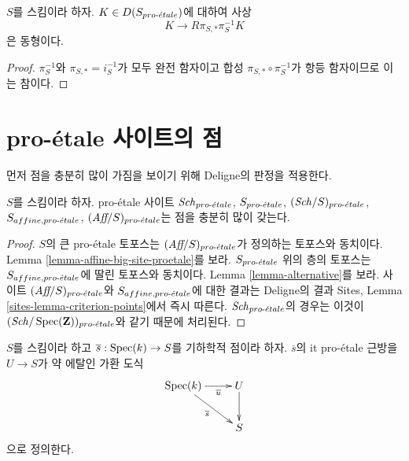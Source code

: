 \begin{lemma}
\label{lemma-cohomological-descent-proetale}
$S$를 스킴이라 하자. $K \in D(S_{pro\text{-}\acute{e}tale})$에 대하여 사상
$$
K \longrightarrow R\pi_{S, *}\pi_S^{-1}K
$$
은 동형이다.
\end{lemma}

\begin{proof}
$\pi_S^{-1}$와 $\pi_{S, *} = i_S^{-1}$가 모두 완전 함자이고 합성
$\pi_{S, *} \circ \pi_S^{-1}$가 항등 함자이므로 이는 참이다.
\end{proof}






















\section{pro-\'etale 사이트의 점}
\label{section-points}

\noindent
먼저 점을 충분히 많이 가짐을 보이기 위해 Deligne의 판정을 적용한다.

\begin{lemma}
\label{lemma-points-proetale}
$S$를 스킴이라 하자. pro-\'etale 사이트
$\mathit{Sch}_{pro\text{-}\acute{e}tale}$, $S_{pro\text{-}\acute{e}tale}$, $(\mathit{Sch}/S)_{pro\text{-}\acute{e}tale}$,
$S_{affine, {pro\text{-}\acute{e}tale}}$, $(\textit{Aff}/S)_{pro\text{-}\acute{e}tale}$는 점을 충분히 많이
갖는다.
\end{lemma}

\begin{proof}
$S$의 큰 pro-\'etale 토포스는 $(\textit{Aff}/S)_{pro\text{-}\acute{e}tale}$가 정의하는
토포스와 동치이다. Lemma \ref{lemma-affine-big-site-proetale}를 보라.
$S_{pro\text{-}\acute{e}tale}$ 위의 층의 토포스는 $S_{affine, {pro\text{-}\acute{e}tale}}$에 딸린
토포스와 동치이다. Lemma \ref{lemma-alternative}를 보라.
사이트 $(\textit{Aff}/S)_{pro\text{-}\acute{e}tale}$와 $S_{affine, {pro\text{-}\acute{e}tale}}$에 대한
결과는 Deligne의 결과 Sites, Lemma
\ref{sites-lemma-criterion-points}에서 즉시 따른다.
$\mathit{Sch}_{pro\text{-}\acute{e}tale}$의 경우는 이것이
$(\mathit{Sch}/\mathop{\mathrm{Spec}}(\mathbf{Z}))_{pro\text{-}\acute{e}tale}$와 같기 때문에 처리된다.
\end{proof}

\noindent
$S$를 스킴이라 하고 $\overline{s} : \mathop{\mathrm{Spec}}(k) \to S$를 기하학적 점이라
하자. $\overline{s}$의 {it pro-\'etale 근방}을 $U \to S$가 약 에탈인
가환 도식
$$
\xymatrix{
\Spec(k) \ar[r]_-{\overline{u}} \ar[rd]_{\overline{s}} & U \ar[d] \\
& S
}
$$
으로 정의한다.

